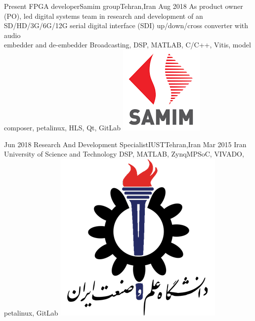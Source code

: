 
\begin{experiences}

  \experience
  {Present} {FPGA developer}{Samim group}{Tehran,Iran}
  {Aug 2018} {
    As product owner (PO), led digital systems team in research and development of an \\
    SD/HD/3G/6G/12G serial digital interface (SDI) up/down/cross converter with audio \\
    embedder and de-embedder
  }
  {Broadcasting, DSP, MATLAB, C/C++, Vitis, model composer, petalinux, HLS, Qt, GitLab}
  {\includegraphics[scale=0.2]{graphics/samim_logo}}

  \emptySeparator

  \experience
  {Jun 2018} {Research And Development Specialist}{IUST}{Tehran,Iran}
  {Mar 2015} {
    Iran University of Science and Technology
  }
  {DSP, MATLAB, ZynqMPSoC, VIVADO, petalinux, GitLab}
  {\includegraphics[scale=0.12]{graphics/IUST_logo_color}}

  \emptySeparator


\end{experiences}
